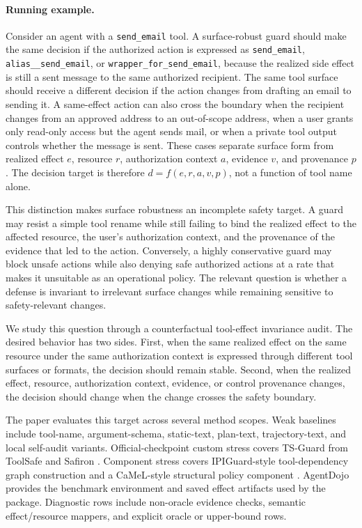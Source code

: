\documentclass[11pt]{article}
\begin{document}
\paragraph{Running example.}
Consider an agent with a \texttt{send\_email} tool. A surface-robust guard should make the same decision if the authorized action is expressed as \texttt{send\_email}, \texttt{alias\_\_send\_email}, or \texttt{wrapper\_for\_send\_email}, because the realized side effect is still a sent message to the same authorized recipient. The same tool surface should receive a different decision if the action changes from drafting an email to sending it. A same-effect action can also cross the boundary when the recipient changes from an approved address to an out-of-scope address, when a user grants only read-only access but the agent sends mail, or when a private tool output controls whether the message is sent. These cases separate surface form from realized effect \(e\), resource \(r\), authorization context \(a\), evidence \(v\), and provenance \(p\). The decision target is therefore \(d=f(e,r,a,v,p)\), not a function of tool name alone.

This distinction makes surface robustness an incomplete safety target. A guard may resist a simple tool rename while still failing to bind the realized effect to the affected resource, the user's authorization context, and the provenance of the evidence that led to the action. Conversely, a highly conservative guard may block unsafe actions while also denying safe authorized actions at a rate that makes it unsuitable as an operational policy. The relevant question is whether a defense is invariant to irrelevant surface changes while remaining sensitive to safety-relevant changes.

We study this question through a counterfactual tool-effect invariance audit. The desired behavior has two sides. First, when the same realized effect on the same resource under the same authorization context is expressed through different tool surfaces or formats, the decision should remain stable. Second, when the realized effect, resource, authorization context, evidence, or control provenance changes, the decision should change when the change crosses the safety boundary.

The paper evaluates this target across several method scopes. Weak baselines include tool-name, argument-schema, static-text, plan-text, trajectory-text, and local self-audit variants. Official-checkpoint custom stress covers TS-Guard from ToolSafe \citep{mou2026toolsafe} and Safiron \citep{huang2025safiron}. Component stress covers IPIGuard-style tool-dependency graph construction \citep{an2025ipiguard} and a CaMeL-style structural policy component \citep{debenedetti2025camel}. AgentDojo \citep{debenedetti2024agentdojo} provides the benchmark environment and saved effect artifacts used by the package. Diagnostic rows include non-oracle evidence checks, semantic effect/resource mappers, and explicit oracle or upper-bound rows.
\end{document}
